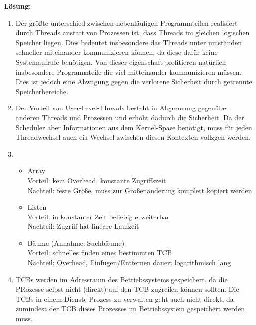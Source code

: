 \begin{description}
\textbf{Lösung:}\\
\begin{enumerate}
	\item Der größte unterschied zwischen nebenläufigen Programmteilen realisiert durch Threads anstatt von Prozessen ist, dass Threads im gleichen logischen Speicher liegen. Dies bedeutet insbesondere das Threads unter umständen schneller miteinander kommunizieren können, da diese dafür keine Systemaufrufe benötigen.
Von dieser eigenschaft profitieren natürlich insbesondere Programmteile die viel mitteinander kommunizieren müssen. Dies ist jedoch eine Abwägung gegen die verlorene Sicherheit durch getrennte Speicherbereiche.
	\item Der Vorteil von User-Level-Threads besteht in Abgrenzung gegenüber anderen Threads und Prozessen und erhöht dadurch die Sicherheit. Da der Scheduler aber Informationen aus dem Kernel-Space benötigt, muss für jeden Threadwechsel auch ein Wechsel zwischen diesen Kontexten vollzgen werden.
	\item 
          \begin{itemize}
            \item Array\\
              Vorteil: kein Overhead, konstante Zugriffszeit\\
              Nachteil: feste Größe, muss zur Größenänderung komplett kopiert werden
            \item Listen\\
              Vorteil: in konstanter Zeit beliebig erweiterbar\\
              Nachteil: Zugriff hat lineare Laufzeit
            \item Bäume (Annahme: Suchbäume) \\
              Vorteil: schnelles finden eines bestimmten TCB\\
              Nachteil: Overhead, Einfügen/Entfernen dauert logarithmisch lang
          \end{itemize}
	\item TCBs werden im Adressraum des Betriebssystems gespeichert, da die PRozesse selbst nicht (direkt) auf den TCB zugreifen können sollten. Die TCBs in einem Dienste-Prozess zu verwalten geht auch nicht direkt, da zumindest der TCB dieses Prozesses im Betriebssystem gespeichert werden muss.
\end{enumerate}





\end{description}
